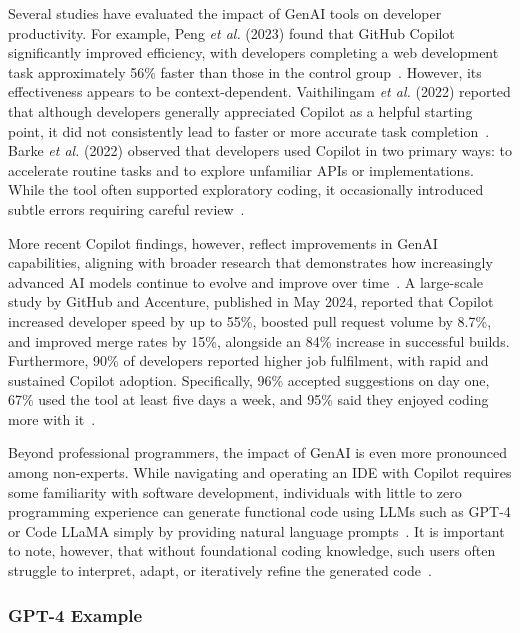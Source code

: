 Several studies have evaluated the impact of GenAI tools on developer productivity. For example, Peng \textit{et al.} (2023) found that GitHub Copilot significantly improved efficiency, with developers completing a web development task approximately 56\% faster than those in the control group~\cite{peng_impact_2023}. However, its effectiveness appears to be context-dependent. Vaithilingam \textit{et al.} (2022) reported that although developers generally appreciated Copilot as a helpful starting point, it did not consistently lead to faster or more accurate task completion~\cite{vaithilingam_expectation_2022}. Barke \textit{et al.} (2022) observed that developers used Copilot in two primary ways: to accelerate routine tasks and to explore unfamiliar APIs or implementations. While the tool often supported exploratory coding, it occasionally introduced subtle errors requiring careful review~\cite{barke_grounded_2023}. 

More recent Copilot findings, however, reflect improvements in GenAI capabilities, aligning with broader research that demonstrates how increasingly advanced AI models continue to evolve and improve over time~\cite{jiang_survey_2024, huynh_large_2025}. A large-scale study by GitHub and Accenture, published in May 2024, reported that Copilot increased developer speed by up to 55\%, boosted pull request volume by 8.7\%, and improved merge rates by 15\%, alongside an 84\% increase in successful builds. Furthermore, 90\% of developers reported higher job fulfilment, with rapid and sustained Copilot adoption. Specifically, 96\% accepted suggestions on day one, 67\% used the tool at least five days a week, and 95\% said they enjoyed coding more with it~\cite{gao_research_2024}.

Beyond professional programmers, the impact of GenAI is even more pronounced among non-experts. While navigating and operating an IDE with Copilot requires some familiarity with software development, individuals with little to zero programming experience can generate functional code using LLMs such as GPT-4 or Code LLaMA simply by providing natural language prompts~\cite{jiang_survey_2024}. It is important to note, however, that without foundational coding knowledge, such users often struggle to interpret, adapt, or iteratively refine the generated code~\cite{ma_srlcg_2025}.

\subsubsection{GPT-4 Example}

